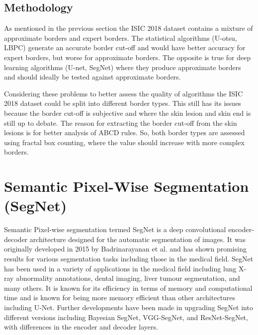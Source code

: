\subsection{Methodology}
As mentioned in the previous section the ISIC 2018 dataset contains a mixture of approximate borders and expert borders. The statistical algorithms (U-otsu, LBPC) generate an accurate border cut-off and would have better accuracy for expert borders, but worse for approximate borders. The opposite is true for deep learning algorithms (U-net, SegNet) where they produce approximate borders and should ideally be tested against approximate borders.

Considering these problems to better assess the quality of algorithms the ISIC 2018 dataset could be split into different border types. This still has its issues because the border cut-off is subjective and where the skin lesion and skin end is still up to debate. The reason for extracting the border cut-off from the skin lesions is for better analysis of ABCD rules. So, both border types are assessed using fractal box counting, where the value should increase with more complex borders. 


\section{Semantic Pixel-Wise Segmentation (SegNet)}
Semantic Pixel-wise segmentation termed SegNet is a deep convolutional encoder-decoder architecture designed for the automatic segmentation of images. It was originally developed in 2015 by Badrinarayanan et al.\cite{} and has shown promising results for various segmentation tasks including those in the medical field. SegNet has been used in a variety of applications in the medical field including lung X-ray abnormality annotations\cite{}, dental imaging\cite{kwak2020}, liver tumour segmentation\cite{Priyadarsini2022}, and many others. It is known for its efficiency in terms of memory and computational time and is known for being more memory efficient than other architectures including U-Net\cite{Mirzazade2021}. Further developments have been made in upgrading SegNet into different versions including Bayesian SegNet\cite{Dhanagopal2022}, VGG-SegNet\cite{}, and ResNet-SegNet\cite{}, with differences in the encoder and decoder layers.


